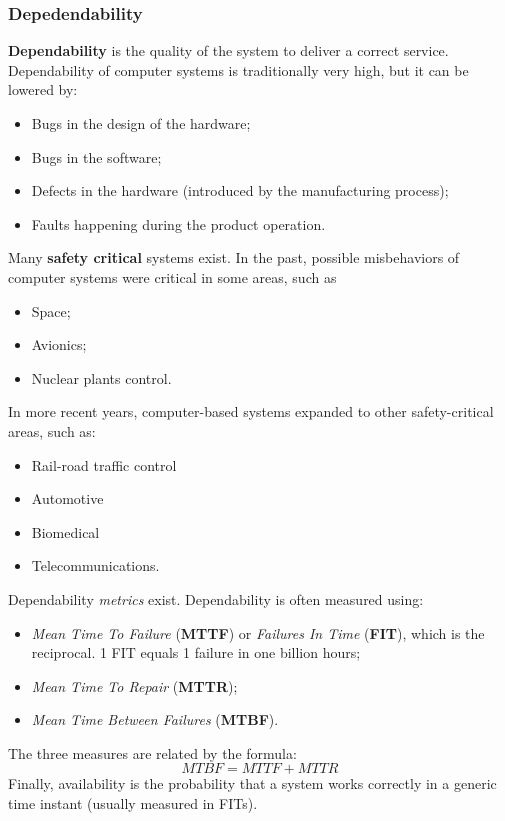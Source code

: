 \documentclass[a4paper,11pt]{article}
\begin{document}
\subsubsection{Depedendability}

\textbf{Dependability} is the quality of the system to deliver a
correct service.
Dependability of computer systems is traditionally very
high, but it can be lowered by:
\begin{itemize}
\item Bugs in the design of the hardware;
\item Bugs in the software;
\item Defects in the hardware (introduced by the manufacturing process);
\item Faults happening during the product operation.
\end{itemize}

Many \textbf{safety critical} systems exist.
In the past, possible misbehaviors of computer systems were critical in some areas, such as
\begin{itemize}
\item Space;
\item Avionics;
\item Nuclear plants control.
\end{itemize}

In more recent years, computer-based systems
expanded to other safety-critical areas, such as:
\begin{itemize}
\item Rail-road traffic control
\item Automotive
\item Biomedical
\item Telecommunications.
\end{itemize}

Dependability \textit{metrics} exist.
Dependability is often measured using:
\begin{itemize}
	\item \textit{Mean Time To Failure} (\textbf{MTTF}) or \textit{Failures In Time} (\textbf{FIT}), which is the reciprocal. 1 FIT equals 1 failure in one billion hours;
	\item \textit{Mean Time To Repair} (\textbf{MTTR});
	\item \textit{Mean Time Between Failures} (\textbf{MTBF}).
\end{itemize}

The three measures are related by the formula:
$$
MTBF = MTTF + MTTR
$$
Finally, availability is the probability that a system works correctly in a generic time instant (usually measured in FITs).
\end{document}
